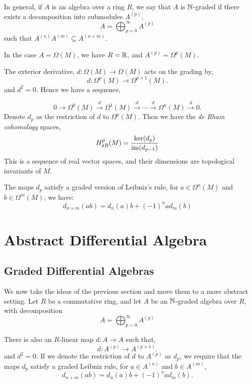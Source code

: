 In general, if $A$ is an algebra over a ring $R$, we say that $A$ is $\mathbb{N}$-graded
if there exists a decomposition into submodules $A^{(p)}$,
\begin{equation*}
    A = \bigoplus_{p=0}^\infty A^{(p)}
\end{equation*}
such that $A^{(n)}A^{(m)} \subseteq A^{(n+m)}$.

In the case $A = \Omega(M)$, we have $R = \mathbb{R}$, and $A^{(p)} = \Omega^p(M)$.

The exterior derivative, $d:\Omega(M)\rightarrow \Omega(M)$ acts on the grading by,
\begin{equation*}
    d:\Omega^p(M) \rightarrow \Omega^{p+1}(M).
\end{equation*}
and $d^2 = 0$. Hence we have a sequence,

\begin{equation*}
    0\rightarrow \Omega^{0}(M) \xrightarrow{d} \Omega^1(M) \xrightarrow{d} \cdots \xrightarrow{d} \Omega^n(M) \xrightarrow{d} 0.
\end{equation*}
Denote $d_p$ as the restriction of $d$ to $\Omega^p(M)$. Then we have the \emph{de Rham cohomology}
spaces,
\begin{equation*}
    H^p_{dR}(M) = \frac{\ker(d_{p})}{\operatorname{im}(d_{p-1})}
\end{equation*}
This is a sequence of real vector spaces, and their dimensions are topological
invariants of $M$.

The maps $d_p$ satisfy a graded version of Leibniz's rule, for $a \in \Omega^n(M)$
and $b \in \Omega^m(M)$, we have:
\begin{equation*}
    d_{n+m}(ab) = d_n(a)b+(-1)^nad_m(b)
\end{equation*}

\section{Abstract Differential Algebra}
\subsection{Graded Differential Algebras}
We now take the ideas of the previous section and move them to a more abstract setting.
Let $R$ be a commutative ring, and let $A$ be an $\mathbb{N}$-graded algebra over $R$, with decomposition
\begin{equation*}
    A = \bigoplus_{p=0}^\infty A^{(p)}
\end{equation*}

There is also an $R$-linear map $d:A\rightarrow A$ such that,
\begin{equation*}
    d:A^{(p)}\rightarrow A^{(p+1)}.
\end{equation*}
and $d^2 = 0$.
If we denote the restriction of $d$ to $A^{(p)}$ as $d_p$, we
require that the maps $d_p$ satisfy a graded Leibniz rule, for $a \in A^{(n)}$
and $b \in A^{(m)}$,
\begin{equation*}
    d_{n+m}(ab) = d_n(a)b+(-1)^nad_m(b).
\end{equation*}

